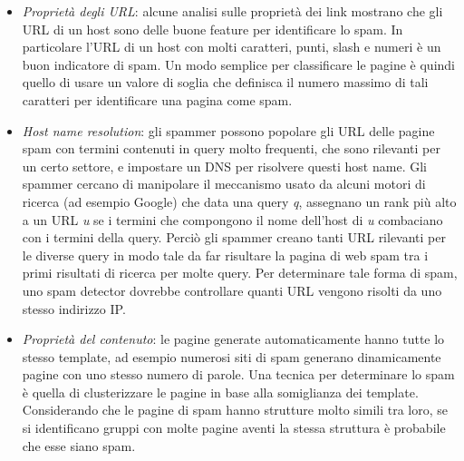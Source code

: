 \begin{itemize}
 \item 	\textit{Proprietà degli URL}: alcune analisi sulle proprietà dei link mostrano che gli URL di un host sono delle buone feature per identificare lo spam. In particolare l'URL di un host con molti caratteri, punti, slash e numeri è un buon indicatore di spam. Un modo semplice per classificare le pagine è quindi quello di usare un valore di soglia che definisca il numero massimo di tali caratteri per identificare una pagina come spam. 
 
 \item \textit{Host name resolution}: gli spammer possono popolare gli URL delle pagine spam con termini contenuti in query molto frequenti, che sono rilevanti per un certo settore,  e impostare un DNS per risolvere questi host name. Gli spammer cercano di manipolare il meccanismo  usato da alcuni motori di ricerca (ad esempio Google) che data una query \textit{q}, assegnano un rank più alto a un URL \textit{u} se i termini che compongono  il nome dell'host di \textit{u} combaciano con i termini della query. Perciò gli spammer creano tanti URL rilevanti per le diverse query in modo tale da far risultare la pagina di web spam tra i primi risultati di ricerca per molte query. Per determinare tale forma di spam, uno spam detector dovrebbe controllare quanti URL vengono risolti da uno stesso indirizzo IP.
 
 \item \textit{Proprietà del contenuto}: le pagine generate automaticamente hanno tutte lo stesso template, ad esempio numerosi siti di spam generano dinamicamente pagine con uno stesso numero di parole. Una tecnica per determinare lo spam è quella di clusterizzare le pagine in base alla somiglianza dei template. Considerando che le pagine di spam hanno strutture molto simili tra loro, se si identificano gruppi con molte pagine aventi la stessa struttura è probabile che esse siano spam.
\end{itemize}


